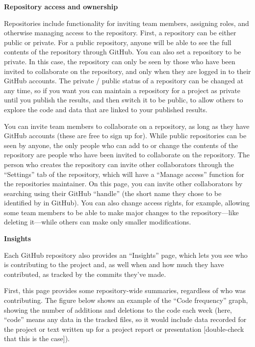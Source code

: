 \documentclass[]{tufte-book}
\begin{document}
\textbf{Repository access and ownership}

Repositories include functionality for inviting team members, assigning
roles, and otherwise managing access to the repository. First, a repository
can be either public or private. For a public repository, anyone will be
able to see the full contents of the repository through GitHub. You can
also set a repository to be private. In this case, the repository can only
be seen by those who have been invited to collaborate on the repository, and
only when they are logged in to their GitHub accounts. The private / public
status of a repository can be changed at any time, so if you want you can
maintain a repository for a project as private until you publish the results,
and then switch it to be public, to allow others to explore the code and data
that are linked to your published results.

You can invite team members to collaborate on a repository, as long as they
have GitHub accounts (these are free to sign up for). While public repositories
can be seen by anyone, the only people who can add to or change the contents
of the repository are people who have been invited to collaborate on the
repository. The person who creates the repository can invite other collaborators
through the ``Settings'' tab of the repository, which will have a ``Manage access''
function for the repositories maintainer. On this page, you can invite other
collaborators by searching using their GitHub ``handle'' (the short name they
chose to be identified by in GitHub). You can also change access rights, for
example, allowing some team members to be able to make major changes to the
repository---like deleting it---while others can make only smaller modifications.

\textbf{Insights}

Each GitHub repository also provides an ``Insights'' page, which lets you see who is
contributing to the project and, as well when and how much they have contributed, as
tracked by the commits they've made.

First, this page provides some repository-wide summaries, regardless of who was
contributing. The figure below shows an example of the ``Code frequency'' graph,
showing the number of additions and deletions to the code each week (here, ``code'' means
any data in the tracked files, so it would include data recorded for the project or
text written up for a project report or presentation {[}double-check that this is the
case{]}).
\end{document}
